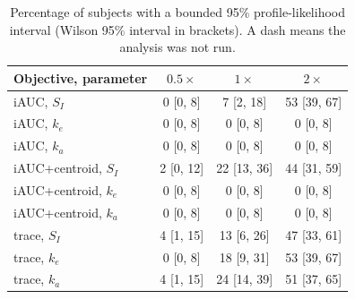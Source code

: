 \begin{table}[t]
\centering\small
\begin{tabular}{lccc}
\toprule
Objective, parameter & $0.5\times$ & $1\times$ & $2\times$ \\
\midrule
iAUC, $S_I$ & 0 [0, 8] & 7 [2, 18] & 53 [39, 67] \\
iAUC, $k_e$ & 0 [0, 8] & 0 [0, 8] & 0 [0, 8] \\
iAUC, $k_a$ & 0 [0, 8] & 0 [0, 8] & 0 [0, 8] \\
iAUC+centroid, $S_I$ & 2 [0, 12] & 22 [13, 36] & 44 [31, 59] \\
iAUC+centroid, $k_e$ & 0 [0, 8] & 0 [0, 8] & 0 [0, 8] \\
iAUC+centroid, $k_a$ & 0 [0, 8] & 0 [0, 8] & 0 [0, 8] \\
trace, $S_I$ & 4 [1, 15] & 13 [6, 26] & 47 [33, 61] \\
trace, $k_e$ & 0 [0, 8] & 18 [9, 31] & 53 [39, 67] \\
trace, $k_a$ & 4 [1, 15] & 24 [14, 39] & 51 [37, 65] \\
\bottomrule
\end{tabular}
\caption{Percentage of subjects with a bounded 95\% profile-likelihood interval (Wilson 95\% interval in brackets). A dash means the analysis was not run.}
\label{tab:profiles}
\end{table}
